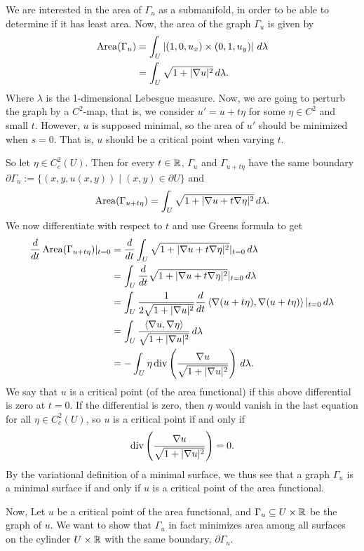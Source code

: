 We are interested in the area of $\Gamma_u$ as a submanifold, in order to be able to determine if it has least area. Now, the area of the graph $\Gamma_u$ is given by
\begin{align}
    \operatorname{Area}(\Gamma_u) &= \int_U \left| (1,0,u_x) \times (0,1,u_y) \right|\, d\lambda \nonumber \\
    &= \int_U \sqrt{1+|\nabla u|^2}\, d\lambda. \label{eq: 3 area formula}
\end{align}
Where $\lambda$ is the 1-dimensional Lebesgue measure.
Now, we are going to perturb the graph by a $C^2$-map, that is, we consider $u'=u+t\eta$ for some $\eta \in C^2$ and small $t$. However, $u$ is supposed minimal, so the area of $u'$ should be minimized when $s=0$. That is, $u$ should be a critical point when varying $t$.

So let $\eta \in C_c^2(U)$.
Then for every $t \in \mathbb{R}$, $\Gamma_u$ and $\Gamma_{u+t\eta}$ have the same boundary $\partial \Gamma_u:=\{(x,y,u(x,y)) \mid (x,y) \in \partial U\}$ and
\[
    \operatorname{Area}(\Gamma_{u+t\eta}) = \int_U \sqrt{1 + |\nabla u + t\nabla \eta|^2}\, d\lambda.
\]
We now differentiate with respect to $t$ and use Greens formula to get
\begin{align*}
    \frac{d}{dt}\operatorname{Area}(\Gamma_{u+t\eta})|_{t=0} &= \frac{d}{dt} \int_U \sqrt{1 + |\nabla u + t\nabla \eta|^2}|_{t=0}\, d\lambda \\
    &= \int_U \frac{d}{dt} \sqrt{1 + |\nabla u + t\nabla \eta|^2}|_{t=0}\, d\lambda \\
    &= \int_U \frac{1}{2\sqrt{1+|\nabla u|^2}}\frac{d}{dt}\left\langle\nabla(u+t\eta), \nabla(u+t\eta)\right\rangle|_{t=0}\, d\lambda \\
    &= \int_U \frac{\left\langle\nabla u, \nabla\eta\right\rangle}{\sqrt{1+|\nabla u|^2}}\, d\lambda \\
    &= -\int_U \eta \operatorname{div}\left(\frac{\nabla u}{\sqrt{1+|\nabla u|^2}}\right)\, d\lambda.
\end{align*}
We say that $u$ is a critical point (of the area functional) if this above differential is zero at $t=0$. If the differential is zero, then $\eta$ would vanish in the last equation for all $\eta \in C_c^2(U)$, so $u$ is a critical point if and only if
\[
    \operatorname{div}\left(\frac{\nabla u}{\sqrt{1+|\nabla u|^2}}\right) = 0.
\]
By the variational definition of a minimal surface, we thus see that a graph $\Gamma_u$ is a minimal surface if and only if $u$ is a critical point of the area functional.


Now, Let $u$ be a critical point of the area functional, and $\Gamma_u \subseteq U \times \mathbb{R}$ be the graph of $u$. We want to show that $\Gamma_u$ in fact minimizes area among all surfaces on the cylinder $U \times \mathbb{R}$ with the same boundary, $\partial \Gamma_u$.

